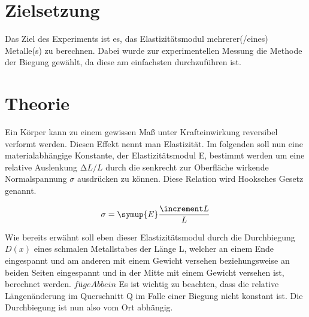 \section{Zielsetzung}
\label{sec:Zielsetzung}

Das Ziel des Experiments ist es, das Elastizitätsmodul mehrerer(/eines) Metalle(s) zu berechnen.
Dabei wurde zur experimentellen Messung die Methode der Biegung gewählt, da diese am einfachsten durchzuführen ist.

\section{Theorie}
\label{sec:Theorie}

Ein Körper kann zu einem gewissen Maß unter Krafteinwirkung reversibel
verformt werden. Diesen Effekt nennt man Elastizität. Im folgenden soll nun
eine materialabhängige Konstante, der Elastizitätsmodul E, bestimmt werden
um eine relative Auslenkung $\increment L/L$ durch die senkrecht zur Oberfläche
wirkende Normalspannung $\sigma$ ausdrücken zu können. Diese Relation wird
Hooksches Gesetz genannt.

\begin{equation}
  \sigma = \symup{E}\frac{\increment L}{L}
  \label{eqn:hook}
\end{equation}

Wie bereits erwähnt soll eben dieser Elastizitätsmodul durch die
Durchbiegung $D(x)$ eines schmalen Metallstabes der Länge L, welcher an
einem Ende eingespannt und am anderen mit einem Gewicht versehen
beziehungsweise an beiden Seiten eingespannt und in der Mitte
mit einem Gewicht versehen ist, berechnet werden.
$füge Abb ein$
Es ist wichtig zu beachten, dass die relative Längenänderung im Querschnitt
Q im Falle einer Biegung nicht konstant ist. Die Durchbiegung ist nun also
vom Ort abhängig.

